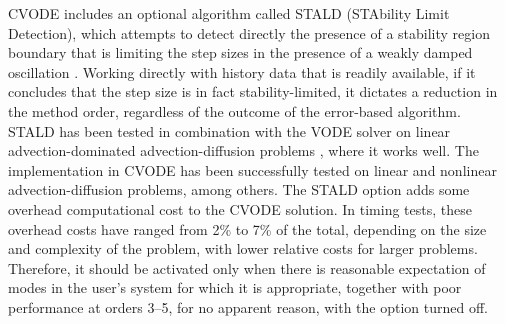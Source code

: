 CVODE includes an optional algorithm called STALD (STAbility Limit
Detection), which attempts to detect directly the presence of a
stability region boundary that is limiting the step sizes in the
presence of a weakly damped oscillation \cite{Hin:92}.  Working
directly with history data that is readily available, if it concludes
that the step size is in fact stability-limited, it dictates a
reduction in the method order, regardless of the outcome of the
error-based algorithm.  STALD has been tested in combination with the
VODE solver on linear advection-dominated advection-diffusion problems
\cite{Hin:95}, where it works well.  The implementation in CVODE has
been successfully tested on linear and nonlinear advection-diffusion
problems, among others.
The STALD option adds some overhead computational cost to the CVODE
solution.  In timing tests, these overhead costs have ranged from 2\%
to 7\% of the total, depending on the size and complexity of the
problem, with lower relative costs for larger problems.  Therefore, it
should be activated only when there is reasonable expectation of modes
in the user's system for which it is appropriate, together with poor
performance at orders 3--5, for no apparent reason, with the option
turned off.
